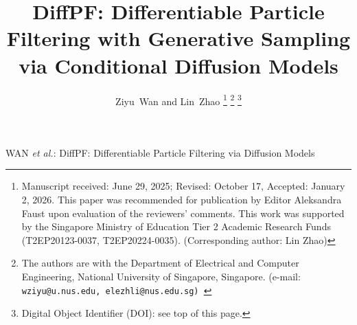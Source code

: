 \usepackage{graphicx}
\usepackage{wrapfig}
\usepackage{caption}
\usepackage{subcaption}
\captionsetup[figure]{font=small}

\usepackage{array}
\usepackage{booktabs}
\usepackage{multirow}
\newcommand{\STAB}[1]{\begin{tabular}{@{}c@{}}#1\end{tabular}}

\usepackage[table,dvipsnames]{xcolor}
\newcommand{\Lin}[1]{\textcolor{blue}{[#1]}}

\usepackage{pifont}
\usepackage[nointegrals]{wasysym}
\usepackage{textcomp}
\newcommand{\cmark}{\ding{51}}%
\newcommand{\xmark}{\ding{55}}%
\newcommand*{\Scale}[2][4]{\scalebox{#1}{$#2$}}%

\usepackage[ruled,vlined]{algorithm2e}

\usepackage{soul}
\usepackage[normalem]{ulem}

\usepackage{mdframed}

\usepackage{cite}
\usepackage{hyperref}
\usepackage{cleveref}

\usepackage{nomencl}
\makenomenclature

\newtheorem{theorem}{Theorem}[section]
\newtheorem{corollary}{Corollary}[theorem]
\newtheorem{lemma}[theorem]{Lemma}
\newtheorem{definition}{Definition}[section]
\renewcommand{\hl}[1]{#1}



\title{DiffPF: Differentiable Particle Filtering with Generative Sampling via Conditional Diffusion Models}

\author{Ziyu~Wan and Lin~Zhao
\thanks{
    Manuscript received: June 29, 2025; Revised: October 17, Accepted: January 2, 2026. This paper was recommended for publication by Editor Aleksandra Faust upon evaluation of the reviewers' comments.
    This work was supported by the Singapore Ministry of Education Tier 2 Academic Research Funds (T2EP20123-0037, T2EP20224-0035). (Corresponding author: Lin Zhao) 
}
\thanks{The authors are with the Department of Electrical and Computer Engineering, National University of Singapore, Singapore. (e-mail: \tt \footnotesize {wziyu@u.nus.edu, elezhli@nus.edu.sg})%
}%
\thanks{Digital Object Identifier (DOI): see top of this page.}
}
%
{WAN \MakeLowercase{\textit{et al.}}: DiffPF: Differentiable Particle Filtering via Diffusion Models}


